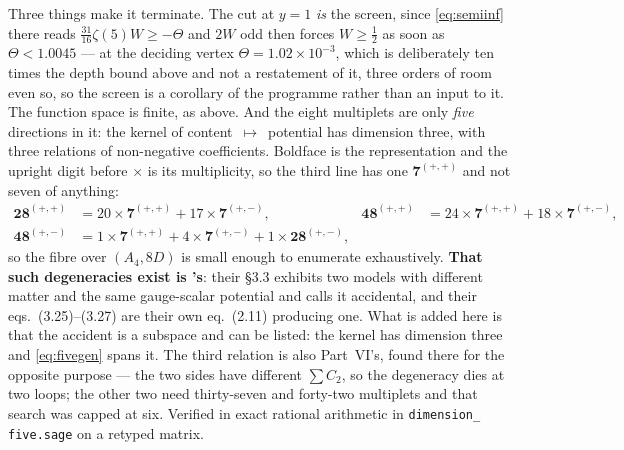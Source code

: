 \documentclass[11pt,a4paper]{article}
\newcommand{\rep}[1]{\mathbf{#1}}
\begin{document}
Three things make it terminate. The cut at $y=1$ \emph{is} the screen, since \eqref{eq:semiinf}
there reads $\tfrac{31}{16}\zeta(5)W\ge-\Theta$ and $2W$ odd then forces $W\ge\tfrac12$ as soon as
$\Theta<1.0045$ --- at the deciding vertex $\Theta=1.02\times10^{-3}$, which is deliberately ten
times the depth bound above and not a restatement of it, three orders of room even so, so the
screen is a corollary of the programme rather than an input to it. The function space is finite, as
above. And the eight multiplets are only \emph{five} directions in it: the kernel of
content~$\mapsto$~potential has dimension three, with three relations of non-negative coefficients.
Boldface is the representation and the upright digit before $\times$ is its multiplicity, so the
third line has one $\rep7^{(+,+)}$ and not seven of anything:
\begin{equation}\label{eq:fivegen}
\begin{aligned}
  \rep{28}^{(+,+)}&=20\times\rep7^{(+,+)}+17\times\rep7^{(+,-)}, &
  \rep{48}^{(+,+)}&=24\times\rep7^{(+,+)}+18\times\rep7^{(+,-)},\\
  \rep{48}^{(+,-)}&=1\times\rep7^{(+,+)}+4\times\rep7^{(+,-)}+1\times\rep{28}^{(+,-)}, & &
\end{aligned}
\end{equation}
so the fibre over $(A_4,8D)$ is small enough to enumerate exhaustively. \textbf{That such
degeneracies exist is \cite{CCD24}'s}: their \S3.3 exhibits two models with different matter and
the same gauge-scalar potential and calls it accidental, and their eqs.~(3.25)--(3.27) are their
own eq.~(2.11) producing one. What is added here is that the accident is a subspace and can be
listed: the kernel has dimension three and \eqref{eq:fivegen} spans it. The third relation is also
Part~VI's, found there for the opposite purpose --- the two sides have different $\sum C_2$, so the
degeneracy dies at two loops; the other two need thirty-seven and forty-two multiplets and that
search was capped at six. Verified in exact rational arithmetic in \texttt{dimension\_\allowbreak
five.sage} on a retyped matrix.
\end{document}
